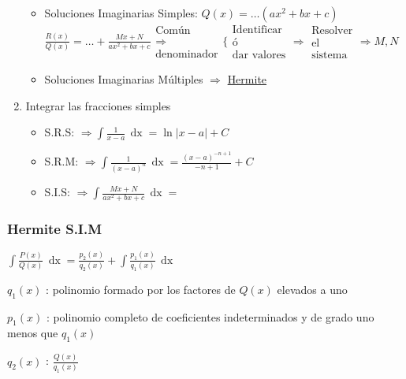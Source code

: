 \documentclass[8pt]{article}
\DeclareMathOperator{\xder}{\, \mathrm{d}x}
\begin{document}
\begin{enumerate}
\begin{itemize}
						\item Soluciones Imaginarias Simples: $ Q(x) = \dots (a x^2 + b x + c) $
							$ \frac{R(x)}{Q(x)} = \dots +
							\frac{Mx + N}{a x^2 + b x + c}
							\begin{array}{c}
								\text{Común}\\
								\Rightarrow\\
								\text{denominador}
							\end{array}
							\Bigg \{
							\begin{array}{c}
								\text{Identificar}\\
								\text{ó}\\
								\text{dar valores}
							\end{array}
							\Rightarrow
							\begin{array}{c}
								\text{Resolver}\\
								\text{el}\\
								\text{sistema}
							\end{array} \Rightarrow M, N $
						\item Soluciones Imaginarias Múltiples $ \Rightarrow $ \underline{Hermite}
					\end{itemize} 

				\item Integrar las fracciones simples
					\begin{itemize}
						\item S.R.S: $ \Rightarrow \int \frac{1}{x-a} \xder = \ln |x-a| + C $
						\item S.R.M: $ \Rightarrow \int \frac{1}{(x-a)^n} \xder = \frac{(x-a)^{-n+1}}{-n+1} + C $
						\item S.I.S: $ \Rightarrow \int \frac{Mx+N}{a x^2 + b x + c} \xder = $
					\end{itemize}

			\end{enumerate}
		\subsubsection{Hermite S.I.M}
			$ \int \frac{P(x)}{Q(x)} \xder = \frac{p_2 (x)}{q_2 (x)} + \int \frac{p_1 (x)}{q_1 (x)} \xder $

			$ q_1 (x) $ : polinomio formado por los factores de $ Q(x) $ elevados a uno

			$ p_1 (x) $ : polinomio completo de coeficientes indeterminados y de grado uno menos que $ q_1 (x) $

			$ q_2 (x) $ : $ \frac{Q(x)}{q_1 (x)} $
\end{document}
